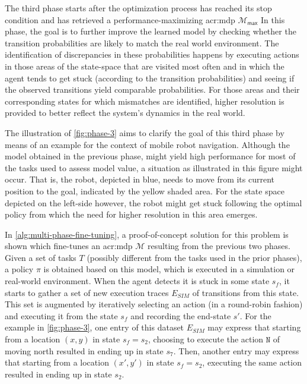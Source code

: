 The third phase starts after the optimization process has reached its stop condition and has retrieved a performance-maximizing \acrshort{acr:mdp} $\mathcal{M}_\mathsf{max}$
In this phase, the goal is to further improve the learned model by checking whether the transition probabilities are likely to match the real world environment.
The identification of discrepancies in these probabilities happens by executing actions in those areas of the state-space that are visited most often and in which the agent tends to get stuck (according to the transition probabilities) and seeing if the observed transitions yield comparable probabilities.
For those areas and their corresponding states for which mismatches are identified, higher resolution is provided to better reflect the system's dynamics in the real world.

The illustration of \autoref{fig:phase-3} aims to clarify the goal of this third phase by means of an example for the context of mobile robot navigation.
Although the model obtained in the previous phase, might yield high performance for most of the tasks used to assess model value, a situation as illustrated in this figure might occur.
That is, the robot, depicted in blue, needs to move from its current position to the goal, indicated by the yellow shaded area.
For the state space depicted on the left-side however, the robot might get stuck following the optimal policy from which the need for higher resolution in this area emerges.

In \autoref{alg:multi-phase-fine-tuning}, a proof-of-concept solution for this problem is shown which fine-tunes an \acrshort{acr:mdp} $\mathcal{M}$ resulting from the previous two phases.
Given a set of tasks $T$ (possibly different from the tasks used in the prior phases), a policy $\pi$ is obtained based on this model, which is executed in a simulation or real-world environment.
When the agent detects it is stuck in some state $s_f$, it starts to gather a set of new execution traces $E_\mathit{SIM}$ of transitions from this state.
This set is augmented by iteratively selecting an action (in a round-robin fashion) and executing it from the state $s_f$ and recording the end-state $s'$.
For the example in \autoref{fig:phase-3}, one entry of this dataset $E_\mathit{SIM}$ may express that starting from a location $(x, y)$ in state $s_f = s_2$, choosing to execute the action $\texttt{N}$ of moving north resulted in ending up in state $s_7$.
Then, another entry may express that starting from a location $(x', y')$ in state $s_f = s_2$, executing the same action resulted in ending up in state $s_2$.

